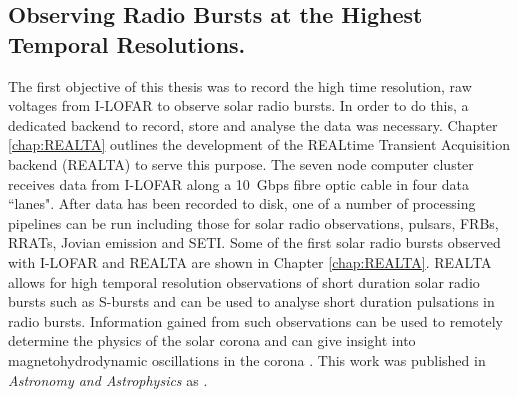 \subsection{Observing Radio Bursts at the Highest Temporal Resolutions.}
The first objective of this thesis was to record the high time resolution, raw voltages from I-LOFAR to observe solar radio bursts.
In order to do this, a dedicated backend to record, store and analyse the data was necessary. Chapter \ref{chap:REALTA} outlines the development of the REALtime Transient Acquisition backend (REALTA) to serve this purpose. The seven node computer cluster receives data from I-LOFAR along a 10~Gbps fibre optic cable in four data ``lanes". After data has been recorded to disk, one of a number of processing pipelines can be run including those for solar radio observations, pulsars, FRBs, RRATs, Jovian emission and SETI. Some of the first solar radio bursts observed with I-LOFAR and REALTA are shown in Chapter \ref{chap:REALTA}. REALTA allows for high temporal resolution observations of short duration solar radio bursts such as S-bursts and can be used to analyse short duration pulsations in radio bursts. Information gained from such observations can be used to remotely determine the physics of the solar corona \citep{Morosan2015, Clarke2019} and can give insight into magnetohydrodynamic oscillations in the corona \citep{Carley2019}. This work was published in \textit{Astronomy and Astrophysics} as \cite{Murphy2021b}.

